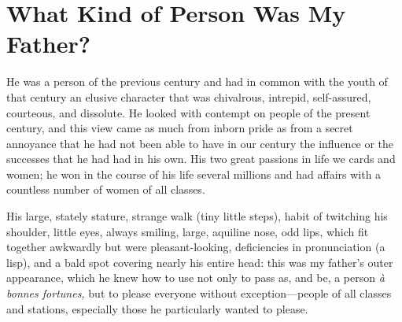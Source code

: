 \chapter{What Kind of Person Was My Father?}

He was a person of the previous century and had in common with the youth of that century an elusive character that was chivalrous, intrepid, self-assured, courteous, and dissolute. He looked with contempt on people of the present century, and this view came as much from inborn pride as from a secret annoyance that he had not been able to have in our century the influence or the successes that he had had in his own. His two great passions in life we cards and women; he won in the course of his life several millions and had affairs with a countless number of women of all classes.

His large, stately stature, strange walk (tiny little steps), habit of twitching his shoulder, little eyes, always smiling, large, aquiline nose, odd lips, which fit together awkwardly but were pleasant-looking, deficiencies in pronunciation (a lisp), and a bald spot covering nearly his entire head: this was my father's outer appearance, which he knew how to use not only to pass as, and be, a person \textit{\`a bonnes fortunes,} but to please everyone without exception---people of all classes and stations, especially those he particularly wanted to please.

